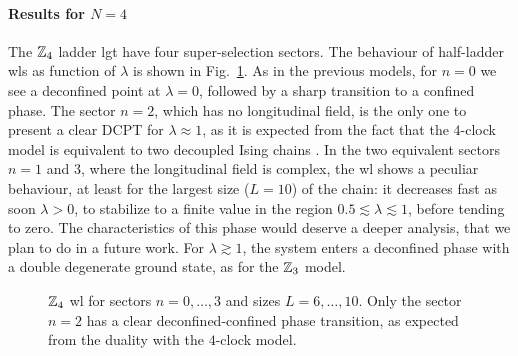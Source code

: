 \paragraph{Results for \texorpdfstring{$N=4$}{N=4}}%
The $\Z_4$ ladder \ac{lgt} have four super-selection sectors.
The behaviour of half-ladder \ac{wl}s as function of $\lambda$ is shown in Fig.~\ref{fig:z4_wilson}.
As in the previous models, for $n=0$ we see a deconfined point at $\lambda = 0$, followed by a sharp transition to a confined phase.
The sector $n=2$, which has no longitudinal field, is the only one to present a clear DCPT for $\lambda \approx 1$, as it is expected from the fact that the $4$-clock model is equivalent to two decoupled Ising chains \cite{ortiz2012dualities}.
In the two equivalent sectors $n=1$ and $3$, where the longitudinal field is complex, the \ac{wl} shows a peculiar behaviour, at least for the largest size ($L=10$) of the chain: it decreases fast as soon $\lambda > 0$, to stabilize to a finite value in the region $0.5 \lesssim \lambda \lesssim 1$, before tending to zero.
The characteristics of this phase would deserve a deeper analysis, that we plan to do in a future work.
For $\lambda \gtrsim 1$, the system enters a deconfined phase with a double degenerate ground state, as for the $\mathbb{Z}_3$ model.


\begin{figure}[t]
    \centering
    
    \vspace*{-10pt}
    \caption[\ac{wl}s for the $\Z_4$ ladder \ac{lgt}]{$\Z_4$ \ac{wl} for sectors $n=0, \dots, 3$ and sizes $L=6, \dots, 10$.
        Only the sector $n = 2$ has a clear deconfined-confined phase transition, as expected from the duality with the $4$-clock model.
    }
    \label{fig:z4_wilson}
\end{figure}

\smallskip

%

